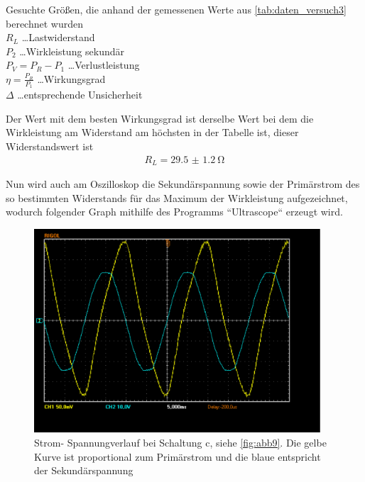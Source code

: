 \documentclass[11pt,ngerman]{scrartcl}
\begin{document}
\begin{table}[H]
	\caption{Gesuchte Größen, die anhand der gemessenen Werte aus
		\autoref{tab:daten_versuch3} berechnet wurden \\
		$R_L$ \dots Lastwiderstand\\
		$P_2$ \dots Wirkleistung sekundär \\
		$P_V = P_R - P_1$ \dots Verlustleistung \\
		$\eta = \frac{P_R}{P_1}$ \dots Wirkungsgrad \\
		$\Delta$ \dots entsprechende Unsicherheit
	}
	\label{tab:ergebnisse_versuch3_extra_cont}
	\begin{center}
		
	\end{center}
\end{table}

Der Wert mit dem besten Wirkungsgrad ist derselbe Wert bei dem die Wirkleistung
am Widerstand am höchsten in der Tabelle ist, dieser Widerstandswert ist
\begin{align*}
	R_L = \SI{29.5(12)}{\ohm}
\end{align*}

Nun wird auch am Oszilloskop die Sekundärspannung sowie der Primärstrom des so
bestimmten Widerstands für das Maximum der Wirkleistung aufgezeichnet, wodurch
folgender Graph mithilfe des Programms ``Ultrascope`` erzeugt wird.


\begin{figure}[H]
	\begin{center}
		\includegraphics[width=0.95\textwidth]{./trafo/maxleistung.pdf}
	\end{center}
	\caption{Strom- Spannungverlauf bei Schaltung c, siehe \autoref{fig:abb9}.
		Die gelbe Kurve ist proportional zum Primärstrom und die blaue entspricht der Sekundärspannung}
	\label{fig:oszi_versuch3}
\end{figure}
\end{document}
